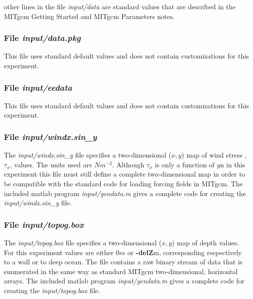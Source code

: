 \noindent other lines in the file {\it input/data} are standard values
that are described in the MITgcm Getting Started and MITgcm Parameters
notes.

\begin{small}

\end{small}

\subsubsection{File {\it input/data.pkg}}
\label{www:tutorials}

This file uses standard default values and does not contain
customizations for this experiment.

\subsubsection{File {\it input/eedata}}
\label{www:tutorials}

This file uses standard default values and does not contain
customizations for this experiment.

\subsubsection{File {\it input/windx.sin\_y}}
\label{www:tutorials}

The {\it input/windx.sin\_y} file specifies a two-dimensional ($x,y$) 
map of wind stress ,$\tau_{x}$, values. The units used are $Nm^{-2}$.
Although $\tau_{x}$ is only a function of $y$n in this experiment
this file must still define a complete two-dimensional map in order
to be compatible with the standard code for loading forcing fields 
in MITgcm. The included matlab program {\it input/gendata.m} gives a complete
code for creating the {\it input/windx.sin\_y} file.

\subsubsection{File {\it input/topog.box}}
\label{www:tutorials}


The {\it input/topog.box} file specifies a two-dimensional ($x,y$) 
map of depth values. For this experiment values are either
$0m$ or {\bf -delZ}m, corresponding respectively to a wall or to deep
ocean. The file contains a raw binary stream of data that is enumerated
in the same way as standard MITgcm two-dimensional, horizontal arrays.
The included matlab program {\it input/gendata.m} gives a complete
code for creating the {\it input/topog.box} file.

